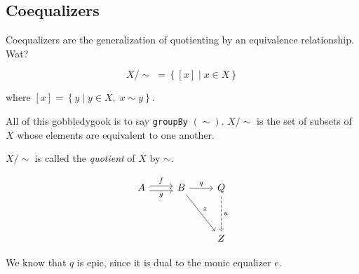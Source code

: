 \documentclass[]{article}
\newcommand{\setn}[1]{\left\{#1\right\}}
\begin{document}
\subsection{Coequalizers}

Coequalizers are the generalization of quotienting by an equivalence
relationship. Wat?

$$
X/\!\sim\;= \setn{[x]\;|\;x \in X}
$$

where $[x] = \setn{y\;|\;y\in X, \;x \sim y}$.

All of this gobbledygook is to say \texttt{groupBy} $(\sim)$. $X/\!\sim$ is the
set of subsets of $X$ whose elements are equivalent to one another.

$X/\!\sim$ is called the \emph{quotient} of $X$ by $\sim$.

$$\begin{tikzcd}
  A \arrow[shift right=1,swap]{r}{g} \arrow[shift left=1]{r}{f} & B
  \arrow{ddr}{z} \arrow{r}{q} & Q \arrow[dashed]{dd}{u} \\
  & & \\
  & & Z
\end{tikzcd}$$

We know that $q$ is epic, since it is dual to the monic equalizer $e$.
\end{document}
